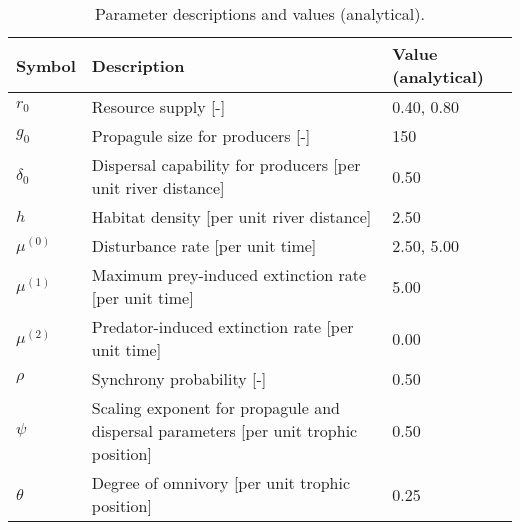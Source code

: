 \begin{table}[ht]
\centering
\caption{Parameter descriptions and values (analytical).\label{tab:parms}} 
\begingroup\small
\begin{tabularx}{\textwidth}{lll}
  \hline
Symbol & Description & Value (analytical) \\ 
  \hline
$r_0$ & Resource supply [-] & 0.40, 0.80 \\ 
  $g_0$ & Propagule size for producers [-] & 150 \\ 
  $\delta_0$ & Dispersal capability for producers [per unit river distance] & 0.50 \\ 
  $h$ & Habitat density [per unit river distance] & 2.50 \\ 
  $\mu^{(0)}$ & Disturbance rate [per unit time] & 2.50, 5.00 \\ 
  $\mu^{(1)}$ & Maximum prey-induced extinction rate [per unit time] & 5.00 \\ 
  $\mu^{(2)}$ & Predator-induced extinction rate [per unit time] & 0.00 \\ 
  $\rho$ & Synchrony probability [-] & 0.50 \\ 
  $\psi$ & Scaling exponent for propagule and dispersal parameters [per unit trophic position] & 0.50 \\ 
  $\theta$ & Degree of omnivory [per unit trophic position] & 0.25 \\ 
   \hline
\end{tabularx}
\endgroup
\end{table}
